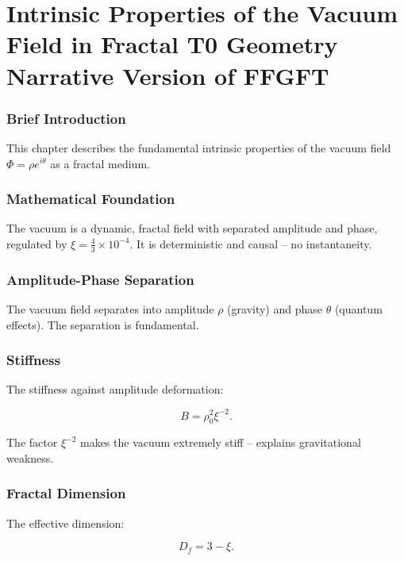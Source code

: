 \chapter{Intrinsic Properties of the Vacuum Field in Fractal T0 Geometry  Narrative Version of FFGFT}


	
	\subsection*{Brief Introduction}
	
	This chapter describes the fundamental intrinsic properties of the vacuum field \(\Phi = \rho e^{i\theta}\) as a fractal medium.
	
	\subsection*{Mathematical Foundation}
	
	The vacuum is a dynamic, fractal field with separated amplitude and phase, regulated by \(\xi = \frac{4}{3} \times 10^{-4}\). It is deterministic and causal – no instantaneity.
	
	\subsection*{Amplitude-Phase Separation}
	
	The vacuum field separates into amplitude \(\rho\) (gravity) and phase \(\theta\) (quantum effects). The separation is fundamental.
	
	\subsection*{Stiffness}
	
	The stiffness against amplitude deformation:
	
	\begin{equation}
		B = \rho_0^2 \xi^{-2}.
	\end{equation}
	
	The factor \(\xi^{-2}\) makes the vacuum extremely stiff – explains gravitational weakness.
	
	\subsection*{Fractal Dimension}
	
	The effective dimension:
	
	\begin{equation}
		D_f = 3 - \xi.
	\end{equation}
	
